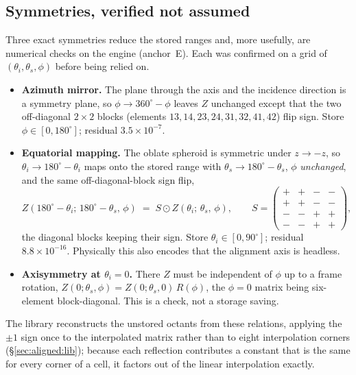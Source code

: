 \documentclass{my_memo}
\begin{document}
\subsection{Symmetries, verified not assumed}\label{sec:aligned:sym}

Three exact symmetries reduce the stored ranges and, more usefully, are numerical
checks on the engine (anchor~E). Each was confirmed on a grid of
$(\theta_i,\theta_s,\phi)$ before being relied on.

\begin{itemize}
\item \textbf{Azimuth mirror.} The plane through the axis and the incidence
      direction is a symmetry plane, so $\phi\to360^\circ-\phi$ leaves $Z$
      unchanged except that the two off-diagonal $2\times2$ blocks (elements
      $13,14,23,24,31,32,41,42$) flip sign. Store $\phi\in[0,180^\circ]$; residual
      $3.5\times10^{-7}$.
\item \textbf{Equatorial mapping.} The oblate spheroid is symmetric under
      $z\to-z$, so $\theta_i\to180^\circ-\theta_i$ maps onto the stored range with
      $\theta_s\to180^\circ-\theta_s$, $\phi$ \emph{unchanged}, and the same
      off-diagonal-block sign flip,
      \[
        Z(180^\circ-\theta_i;\,180^\circ-\theta_s,\,\phi)\;=\;S\odot
        Z(\theta_i;\,\theta_s,\,\phi),\qquad
        S=\begin{pmatrix}+&+&-&-\\ +&+&-&-\\ -&-&+&+\\ -&-&+&+\end{pmatrix},
      \]
      the diagonal blocks keeping their sign. Store $\theta_i\in[0,90^\circ]$;
      residual $8.8\times10^{-16}$. Physically this also encodes that the
      alignment axis is headless.
\item \textbf{Axisymmetry at $\theta_i=0$.} There $Z$ must be independent of
      $\phi$ up to a frame rotation, $Z(0;\theta_s,\phi)=Z(0;\theta_s,0)\,
      R(\phi)$, the $\phi=0$ matrix being six-element block-diagonal. This is a
      check, not a storage saving.
\end{itemize}

The library reconstructs the unstored octants from these relations, applying the
$\pm1$ sign once to the interpolated matrix rather than to eight interpolation
corners (\S\ref{sec:aligned:lib}); because each reflection contributes a constant
that is the same for every corner of a cell, it factors out of the linear
interpolation exactly.
\end{document}

